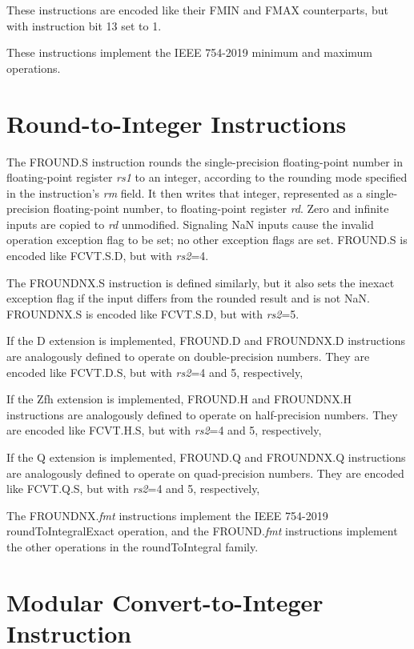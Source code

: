 These instructions are encoded like their FMIN and FMAX counterparts, but
with instruction bit 13 set to 1.

\begin{commentary}
These instructions implement the IEEE 754-2019 minimum and maximum operations.
\end{commentary}


\section{Round-to-Integer Instructions}

The FROUND.S instruction rounds the single-precision floating-point number in
floating-point register {\em rs1} to an integer, according to the rounding
mode specified in the instruction's {\em rm} field.
It then writes that integer, represented as a single-precision floating-point
number, to floating-point register {\em rd}.
Zero and infinite inputs are copied to {\em rd} unmodified.
Signaling NaN inputs cause the invalid operation exception flag to be set; no
other exception flags are set.
FROUND.S is encoded like FCVT.S.D, but with {\em rs2}=4.

The FROUNDNX.S instruction is defined similarly, but it also sets the inexact
exception flag if the input differs from the rounded result and is not NaN.
FROUNDNX.S is encoded like FCVT.S.D, but with {\em rs2}=5.

If the D extension is implemented, FROUND.D and FROUNDNX.D instructions are
analogously defined to operate on double-precision numbers.
They are encoded like FCVT.D.S, but with {\em rs2}=4 and 5, respectively,

If the Zfh extension is implemented, FROUND.H and FROUNDNX.H instructions are
analogously defined to operate on half-precision numbers.
They are encoded like FCVT.H.S, but with {\em rs2}=4 and 5, respectively,

If the Q extension is implemented, FROUND.Q and FROUNDNX.Q instructions are
analogously defined to operate on quad-precision numbers.
They are encoded like FCVT.Q.S, but with {\em rs2}=4 and 5, respectively,

\begin{commentary}
The FROUNDNX.{\em fmt} instructions implement the IEEE 754-2019
roundToIntegralExact operation, and the FROUND.{\em fmt} instructions
implement the other operations in the roundToIntegral family.
\end{commentary}


\section{Modular Convert-to-Integer Instruction}

